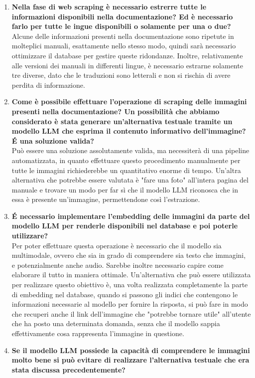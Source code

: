\begin{enumerate}
\begin{enumerate}[label=\Alph*)]
\begin{itemize}
        \end{itemize}
        \item \textbf{Nella fase di web scraping è necessario estrerre tutte le informazioni disponibili nella documentazione? Ed è necessario farlo per tutte le ingue disponibili o solamente per una o due?}\\
        Alcune delle informazioni presenti nella documentazione sono ripetute in molteplici manuali, esattamente nello stesso modo, quindi sarà necessario ottimizzare il database per gestire queste ridondanze. Inoltre, relativamente alle versioni dei manuali in differenti lingue, è necessario estrarne solamente tre diverse, dato che le traduzioni sono letterali e non si rischia di avere perdita di informazione.
        \item \textbf{Come è possibile effettuare l'operazione di scraping delle immagini presenti nella documentazione? Un possibilità che abbiamo considerato è stata generare un'alternativa testuale tramite un modello LLM che esprima il contenuto informativo dell'immagine? \'E una soluzione valida?}\\
        Può essere una soluzione assolutamente valida, ma necessiterà di una pipeline automatizzata, in quanto effettuare questo procedimento manualmente per tutte le immagini richiederebbe un quantitativo enorme di tempo. Un'altra alternativa che potrebbe essere valutata è "fare una foto" all'intera pagina del manuale e trovare un modo per far sì che il modello LLM riconosca che in essa è presente un'immagine, permettendone così l'estrazione.
        \item \textbf{\'E necessario implementare l'embedding delle immagini da parte del modello LLM per renderle disponibili nel database e poi poterle utilizzare?}\\
        Per poter effettuare questa operazione è necessario che il modello sia multimodale, ovvero che sia in grado di comprendere sia testo che immagini, e potenzialmente anche audio. Sarebbe inoltre necessario capire come elaborare il tutto in maniera ottimale. Un'alternativa che può essere utilizzata per realizzare questo obiettivo è, una volta realizzata completamente la parte di embedding nel database, quando si passono gli indici che contengono le informazioni necessarie al modello per fornire la risposta, si può fare in modo che recuperi anche il link dell'immagine che "potrebbe tornare utile" all'utente che ha posto una determinata domanda, senza che il modello sappia effettivamente cosa rappresenta l'immagine in questione.
        \item \textbf{Se il modello LLM possiede la capacità di comprendere le immagini molto bene si può evitare di realizzare l'alternativa testuale che era stata discussa precedentemente?}\\

\end{enumerate}
\end{enumerate}
